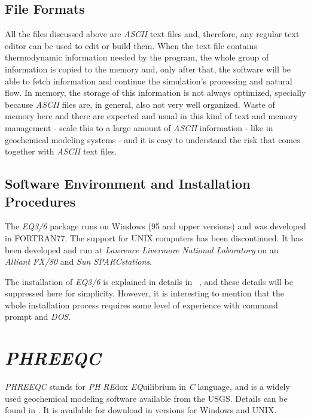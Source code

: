 \subsection{File Formats}
All the files discussed above are \emph{ASCII} text files and, therefore, any regular text editor can be used to edit or build them. When the text file contains thermodynamic information needed by the program, the whole group of information is copied to the memory and, only after that, the software will be able to fetch information and continue the simulation's processing and natural flow. In memory, the storage of this information is not always optimized, specially because \emph{ASCII} files are, in general, also not very well organized. Waste of memory here and there are expected and usual in this kind of text and memory management - scale this to a large amount of \emph{ASCII} information - like in geochemical modeling systems - and it is easy to understand the risk that comes together with \emph{ASCII} text files. 

\subsection{Software Environment and Installation Procedures}
The \emph{EQ3/6} package runs on Windows (95 and upper versions) and was developed in FORTRAN77. The support for UNIX computers has been discontinued.  It has been developed and run at \emph{Lawrence Livermore National Laboratory} on an \emph{Alliant FX/80} and \emph{Sun SPARCstations}.

The installation of \emph{EQ3/6} is explained in details in ~\cite{Wolery:1992}, and these details will be suppressed here for simplicity. However, it is interesting to mention that the whole installation process requires some level of experience with command prompt and \emph{DOS}.



\section{\emph{PHREEQC}}
\emph{PHREEQC} stands for \emph{PH} \emph{RE}dox \emph{EQ}uilibrium in \emph{C} language, and is a widely used geochemical modeling software available from the USGS. Details can be found in \cite{Parkhurst:95}. It is available for download in versions for Windows and UNIX. 

